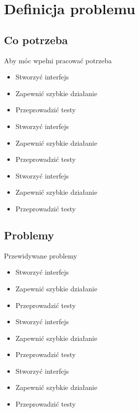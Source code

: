 \chapter{Definicja problemu}
\label{cha:Definicja problemu}

\section{Co potrzeba}
\label{sec:Co potrzeba}

Aby móc wpełni pracować potrzeba

\begin{itemize}
\item
Stworzyć interfejs
\item
Zapewnić szybkie działanie
\item
Przeprowadzić testy
\item
Stworzyć interfejs
\item
Zapewnić szybkie działanie
\item
Przeprowadzić testy
\item
Stworzyć interfejs
\item
Zapewnić szybkie działanie
\item
Przeprowadzić testy
\end{itemize}


\section{Problemy}
\label{sec:Problemy}

Przewidywane problemy

\begin{itemize}
\item
Stworzyć interfejs
\item
Zapewnić szybkie działanie
\item
Przeprowadzić testy
\item
Stworzyć interfejs
\item
Zapewnić szybkie działanie
\item
Przeprowadzić testy
\item
Stworzyć interfejs
\item
Zapewnić szybkie działanie
\item
Przeprowadzić testy
\end{itemize}


